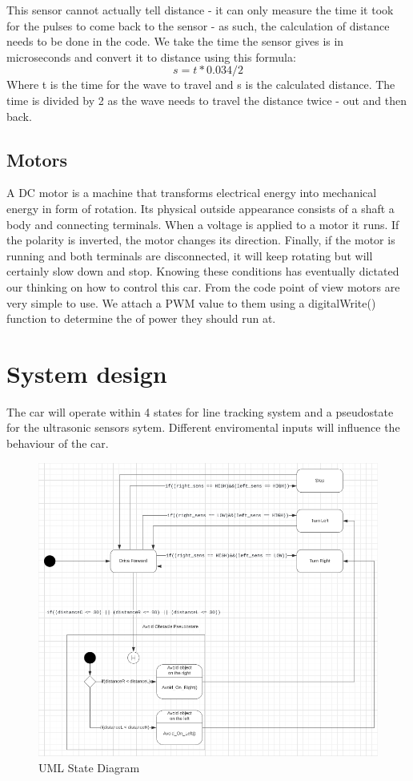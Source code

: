 \documentclass[conference]{IEEEtran}
\begin{document}
This sensor cannot actually tell distance - it can only measure the time it took for the pulses to come back to the sensor - as such, the calculation of distance needs to be done in the code.
We take the time the sensor gives is in microseconds and convert it to distance using this formula:
\begin{equation}
	s=t*0.034/2
\end{equation}
Where t is the time for the wave to travel and s is the calculated distance. The time is divided by 2 as the wave needs to travel the distance twice - out and then back.

\subsection{Motors}
A DC motor is a machine that transforms electrical energy into mechanical energy in form of rotation. Its physical outside appearance consists of a shaft a body and connecting terminals. 
When a voltage is applied to a motor it runs. If the polarity is inverted, the motor changes its direction. Finally, if the motor is running and both terminals are disconnected, it will keep rotating but will certainly slow down and stop. Knowing these conditions has eventually dictated our thinking on how to control this car.
From the code point of view motors are very simple to use. We attach a PWM value to them using a digitalWrite() function to determine the \text{\%} of power they should run at.




\section{System design}
The car will operate within 4 states for line tracking system and a pseudostate for the ultrasonic sensors sytem. Different enviromental inputs will influence the behaviour of the car.
\begin{figure}[h!]
	\includegraphics[width=\linewidth]{UMLStateDiagram.png}
	\caption{UML State Diagram}
	\label{fig:UMLSM1}
\end{figure}
\end{document}
